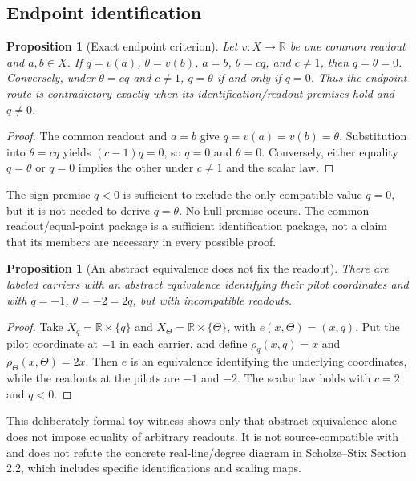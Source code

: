 \documentclass[11pt]{article}
\newtheorem{proposition}[theorem]{Proposition}
\begin{document}
\subsection{Endpoint identification}
\begin{proposition}[Exact endpoint criterion]\label{prop:endpoint}
Let $v:X\to\mathbb R$ be one common readout and $a,b\in X$. If $q=v(a)$, $\theta=v(b)$, $a=b$, $\theta=cq$, and $c\ne1$, then $q=\theta=0$. Conversely, under $\theta=cq$ and $c\ne1$, $q=\theta$ if and only if $q=0$. Thus the endpoint route is contradictory exactly when its identification/readout premises hold and $q\ne0$.
\end{proposition}
\begin{proof}
The common readout and $a=b$ give $q=v(a)=v(b)=\theta$. Substitution into $\theta=cq$ yields $(c-1)q=0$, so $q=0$ and $\theta=0$. Conversely, either equality $q=\theta$ or $q=0$ implies the other under $c\ne1$ and the scalar law.
\end{proof}
The sign premise $q<0$ is sufficient to exclude the only compatible value $q=0$, but it is not needed to derive $q=\theta$. No hull premise occurs. The common-readout/equal-point package is a sufficient identification package, not a claim that its members are necessary in every possible proof.

\begin{proposition}[An abstract equivalence does not fix the readout]
There are labeled carriers with an abstract equivalence identifying their pilot coordinates and with $q=-1$, $\theta=-2=2q$, but with incompatible readouts.
\end{proposition}
\begin{proof}
Take $X_q=\mathbb R\times\{q\}$ and $X_\Theta=\mathbb R\times\{\Theta\}$, with $e(x,\Theta)=(x,q)$. Put the pilot coordinate at $-1$ in each carrier, and define $\rho_q(x,q)=x$ and $\rho_\Theta(x,\Theta)=2x$. Then $e$ is an equivalence identifying the underlying coordinates, while the readouts at the pilots are $-1$ and $-2$. The scalar law holds with $c=2$ and $q<0$.
\end{proof}
This deliberately formal toy witness shows only that abstract equivalence alone does not impose equality of arbitrary readouts. It is not source-compatible with and does not refute the concrete real-line/degree diagram in Scholze--Stix Section 2.2, which includes specific identifications and scaling maps.
\end{document}
